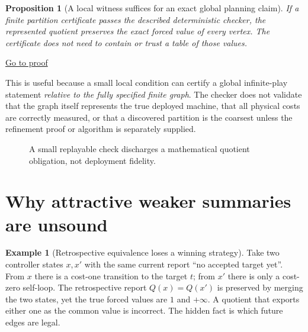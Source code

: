 \documentclass[11pt,letterpaper]{article}
\newtheorem{proposition}[theorem]{Proposition}
\theoremstyle{definition}
\newtheorem{example}[theorem]{Example}
\theoremstyle{remark}
\newcommand{\backproof}[1]{\hfill\hyperlink{proof:#1}{\footnotesize Go to proof}}
\begin{document}
\begin{proposition}[A local witness suffices for an exact global planning claim]\label{prop:check}\hypertarget{stmt:check}{}
If a finite partition certificate passes the described deterministic checker, the represented quotient preserves the exact forced value of every vertex. The certificate does not need to contain or trust a table of those values.
\end{proposition}\backproof{check}

This is useful because a small local condition can certify a global infinite-play statement \emph{relative to the fully specified finite graph}. The checker does not validate that the graph itself represents the true deployed machine, that all physical costs are correctly measured, or that a discovered partition is the coarsest unless the refinement proof or algorithm is separately supplied.

\begin{figure}[ht]
\centering{}
\caption{A small replayable check discharges a mathematical quotient obligation, not deployment fidelity.}
\end{figure}

\section{Why attractive weaker summaries are unsound}
\begin{example}[Retrospective equivalence loses a winning strategy]\label{ex:retro}
Take two controller states $x,x'$ with the same current report ``no accepted target yet''. From $x$ there is a cost-one transition to the target $t$; from $x'$ there is only a cost-zero self-loop. The retrospective report $Q(x)=Q(x')$ is preserved by merging the two states, yet the true forced values are $1$ and $+\infty$. A quotient that exports either one as the common value is incorrect. The hidden fact is which future edges are legal.
\end{example}
\end{document}
